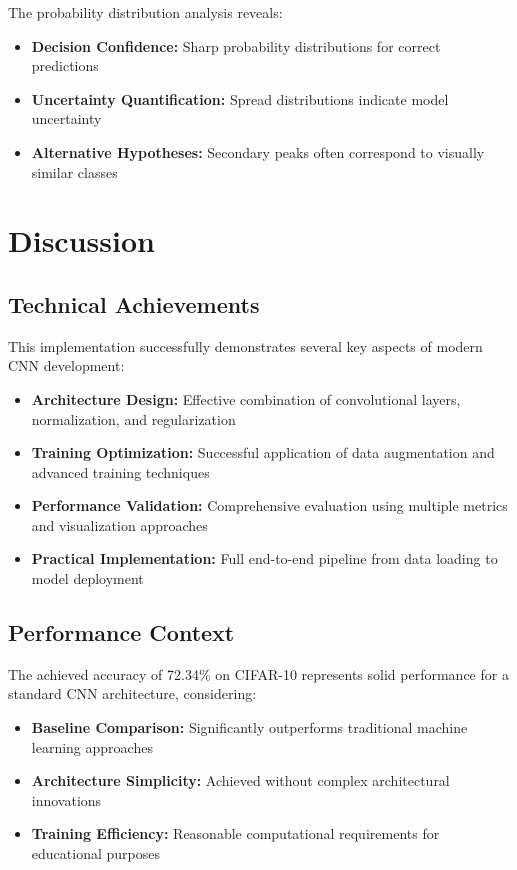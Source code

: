 \documentclass[11pt,a4paper]{article}
\begin{document}
The probability distribution analysis reveals:

\begin{itemize}
    \item \textbf{Decision Confidence:} Sharp probability distributions for correct predictions
    \item \textbf{Uncertainty Quantification:} Spread distributions indicate model uncertainty
    \item \textbf{Alternative Hypotheses:} Secondary peaks often correspond to visually similar classes
\end{itemize}

\section{Discussion}

\subsection{Technical Achievements}

This implementation successfully demonstrates several key aspects of modern CNN development:

\begin{itemize}
    \item \textbf{Architecture Design:} Effective combination of convolutional layers, normalization, and regularization
    \item \textbf{Training Optimization:} Successful application of data augmentation and advanced training techniques
    \item \textbf{Performance Validation:} Comprehensive evaluation using multiple metrics and visualization approaches
    \item \textbf{Practical Implementation:} Full end-to-end pipeline from data loading to model deployment
\end{itemize}

\subsection{Performance Context}

The achieved accuracy of 72.34\% on CIFAR-10 represents solid performance for a standard CNN architecture, considering:

\begin{itemize}
    \item \textbf{Baseline Comparison:} Significantly outperforms traditional machine learning approaches
    \item \textbf{Architecture Simplicity:} Achieved without complex architectural innovations
    \item \textbf{Training Efficiency:} Reasonable computational requirements for educational purposes
\end{itemize}
\end{document}
